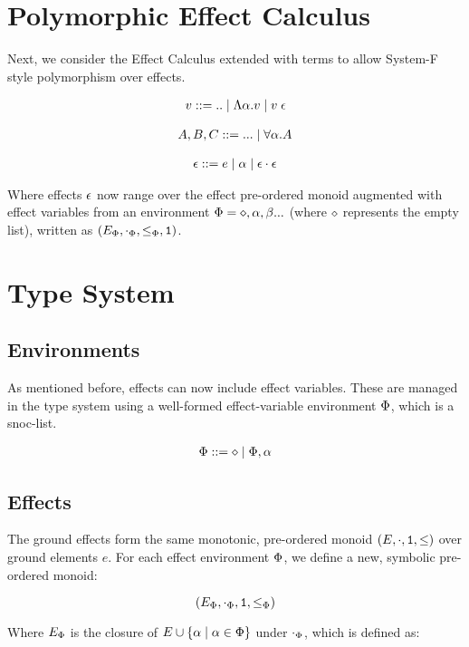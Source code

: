\documentclass{Report}
\begin{document}
\section{Polymorphic Effect Calculus}
Next, we consider the Effect Calculus extended with terms to allow System-F style polymorphism over effects.

\begin{align}
    v::=\text{..}\mid\elam{\a}{v}\mid\eapp{v}{\e}
\end{align}

\begin{align}
    A, B, C::=\text{...}\mid \all{\a}{A}
\end{align}

\begin{align}
    \e ::= e \mid \a \mid \e\dot\e
\end{align}

Where effects $\e$ now range over the effect pre-ordered monoid augmented with effect variables from an environment $\P = \nil, \a, \b ...$ (where $\nil$ represents the empty list), written as $(E_\P, \dotp, \subeffectp, \1)$.

\section{Type System}
\subsection{Environments}
As mentioned before, effects can now include effect variables. These are managed in the type system using a well-formed effect-variable environment $\P$, which is a snoc-list.

\begin{align}
    \P ::= \nil \mid \P, \a
\end{align}



\subsection{Effects}
The ground effects form the same monotonic, pre-ordered monoid $(E, \dot, \1, \subeffect)$ over ground elements $e$. For each effect environment $\P$, we define a new, symbolic pre-ordered monoid:

\begin{equation}
    (E_\P, \dotp, \1, \subeffectp)
\end{equation}

Where $E_\P$ is the closure of $E\cup \left\{\a\mid\a\in\P\right\}$ under $\dotp$, which is defined as:
\end{document}
